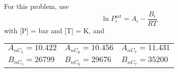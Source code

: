 \documentclass[calculator,steamtables,datasheet,solutions]{exam}
\newcommand{\frc}{\displaystyle\frac}
\begin{document}
\begin{question}
{}

For this problem, use 
\begin{displaymath}
   \ln P_{i}^{\text{sat}} = A_{i} - \frc{B_{i}}{RT}
\end{displaymath} 
with [P] = bar and [T] = K, and
    \begin{center}
       \begin{tabular}{l l l} 
          $A_{nC_{5}}=10.422$ & $A_{nC_{6}}=10.456$ & $A_{nC_{7}}=11.431$ \\
          $B_{nC_{5}}=26799$  & $B_{nC_{6}}=29676$  & $B_{nC_{7}}=35200$  
       \end{tabular}
    \end{center}
%
\end{question}

\clearpage
\end{document}

